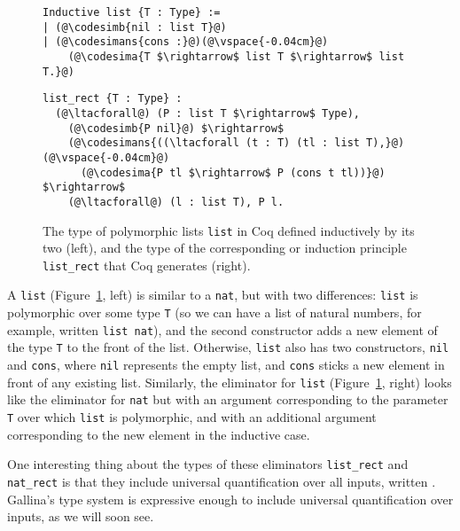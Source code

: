 \begin{figure}
\begin{minipage}{0.44\textwidth}
\begin{lstlisting}
Inductive list {T : Type} :=
| (@\codesimb{nil : list T}@)
| (@\codesimans{cons :}@)(@\vspace{-0.04cm}@)
    (@\codesima{T $\rightarrow$ list T $\rightarrow$ list T.}@)
\end{lstlisting}
\end{minipage}
\hfill
\begin{minipage}{0.55\textwidth}
\begin{lstlisting}
list_rect {T : Type} :
  (@\ltacforall@) (P : list T $\rightarrow$ Type),
    (@\codesimb{P nil}@) $\rightarrow$
    (@\codesimans{((\ltacforall (t : T) (tl : list T),}@)(@\vspace{-0.04cm}@)
      (@\codesima{P tl $\rightarrow$ P (cons t tl))}@) $\rightarrow$
    (@\ltacforall@) (l : list T), P l.
\end{lstlisting}
\end{minipage}
\caption{The type of polymorphic lists \lstinline{list} in Coq defined inductively by its two  (left), and the type of the corresponding  or induction principle \lstinline{list_rect} that Coq generates (right).}
\label{fig:list}
\end{figure}


A \lstinline{list} (Figure~\ref{fig:list}, left) is similar to a \lstinline{nat}, 
but with two differences: \lstinline{list} is polymorphic over some type \lstinline{T} (so we can have a list of natural numbers,
for example, written \lstinline{list nat}), and the second constructor adds a new element of the type \lstinline{T} to the front of the list.
Otherwise, \lstinline{list} also has two constructors, \lstinline{nil} and \lstinline{cons}, where \lstinline{nil} represents the empty list,
and \lstinline{cons} sticks a new element in front of any existing list.
Similarly, the eliminator for \lstinline{list} (Figure~\ref{fig:list}, right) looks like the eliminator for \lstinline{nat} 
but with an argument corresponding to the parameter \lstinline{T} over which \lstinline{list} is polymorphic,
and with an additional argument corresponding to the new element in the inductive case.

One interesting thing about the types of these eliminators \lstinline{list_rect} and \lstinline{nat_rect}
is that they include universal quantification over all inputs, written \ltacforall.
Gallina's type system is expressive enough to include universal quantification over inputs, as we will soon see.

